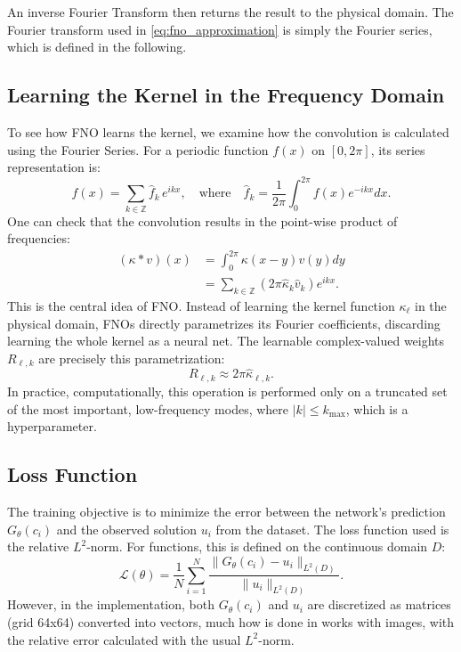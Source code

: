 An inverse Fourier Transform then returns the result to the physical domain.
The Fourier transform used in \eqref{eq:fno_approximation} is simply the
Fourier series, which is defined in the following.

\subsection{Learning the Kernel in the Frequency Domain}
To see how FNO learns the kernel, we examine how the convolution is calculated
using the Fourier Series. For a periodic function $f(x)$ on $[0, 2\pi]$, its
series representation is:
\[
    f(x) = \sum_{k \in \mathbb{Z}} \hat{f}_k \, e^{ikx}, \quad \text{where} \quad \hat{f}_k = \frac{1}{2\pi} \int_0^{2\pi} f(x) e^{-ikx} dx.
\]
One can check that the convolution results in the point-wise product of
frequencies:
\begin{align*}
    (\kappa * v)(x) & = \int_0^{2\pi} \kappa(x-y) v(y) dy                                \\
                    & = \sum_{k \in \mathbb{Z}} (2\pi \hat{\kappa}_k \hat{v}_k) e^{ikx}.
\end{align*}
This is the central idea of FNO. Instead of learning the kernel function $\kappa_\ell$ in the physical domain, FNOs directly parametrizes its Fourier coefficients, discarding learning the whole kernel as a neural net. The learnable complex-valued weights $R_{\ell,k}$ are precisely this parametrization:
\[
    R_{\ell,k} \approx 2\pi \hat{\kappa}_{\ell,k}.
\]
In practice, computationally, this operation is performed only on a truncated
set of the most important, low-frequency modes, where $|k| \le k_{\max}$, which
is a hyperparameter.

\subsection{Loss Function}

The training objective is to minimize the error between the network's
prediction $G_\theta(c_i)$ and the observed solution $u_i$ from the dataset.
The loss function used is the relative $L^2$-norm. For functions, this is
defined on the continuous domain $D$:
\begin{equation}
    \mathcal{L}(\theta) = \frac{1}{N} \sum_{i=1}^N \frac{\| G_\theta(c_i) - u_i \|_{L^2(D)}}{\| u_i \|_{L^2(D)}}.
\end{equation}
However, in the implementation, both $G_\theta(c_i)$ and $u_i$ are discretized as matrices (grid 64x64) converted into vectors, much how is done in works with images, with the relative error calculated with the usual $L^2$-norm.